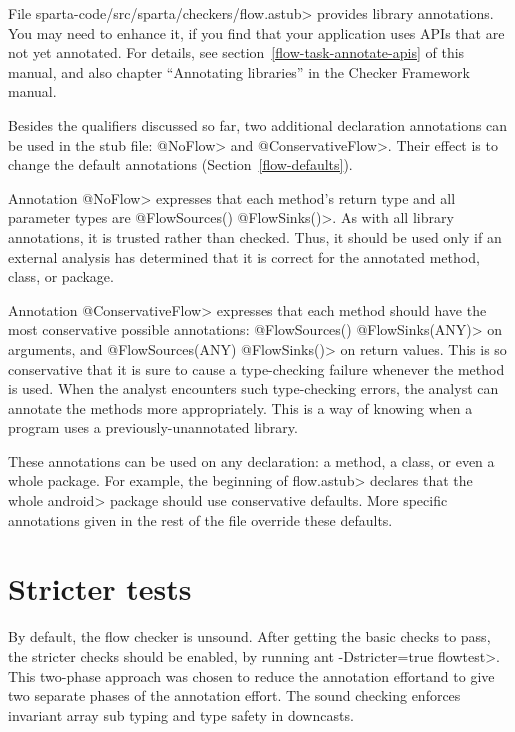 File \<sparta-code/src/sparta/checkers/flow.astub> provides library
annotations.  You may need to enhance it, if you find that your application
uses APIs that are not yet annotated.  For details, see
section~\ref{flow-task-annotate-apis} of this manual, and also 
chapter
``Annotating libraries'' in the Checker Framework manual.

\label{ConservativeFlow}

Besides the qualifiers discussed so far, two additional declaration
annotations can be used in the stub file: \<@NoFlow> and \<@ConservativeFlow>.
Their effect is to change the default annotations (Section~\ref{flow-defaults}).

Annotation \<@NoFlow> expresses that each method's return type and all
parameter types are \<@FlowSources({}) @FlowSinks({})>.  As with all
library annotations, it is trusted rather than checked.  Thus, it should be
used only if an external analysis has determined that it is correct for the
annotated method, class, or package.

Annotation \<@ConservativeFlow> expresses that each method should have the
most conservative possible annotations:
  \<@FlowSources({}) @FlowSinks(ANY)> on arguments, and
  \<@FlowSources(ANY) @FlowSinks({})> on return values.
This is so conservative that it is sure to cause a type-checking failure
whenever the method is used.
When the analyst encounters such type-checking errors, the analyst can
annotate the methods more appropriately.  This is a way of knowing when a
program uses a previously-unannotated library.

These annotations can be used on any declaration: a method, a class,
or even a whole package.
For example, the beginning of \<flow.astub> declares that the
whole \<android> package should use conservative defaults.
More specific annotations given in the rest of the file override these
defaults.


\section{Stricter tests}

By default, the flow checker is unsound.  After getting the basic checks to pass, the
 stricter checks should be enabled, by running \<ant -Dstricter=true flowtest>.
This two-phase approach was chosen to reduce
the annotation effortand to give two separate phases of
the annotation effort.
 The sound checking enforces invariant 
array sub typing and type safety in downcasts.


